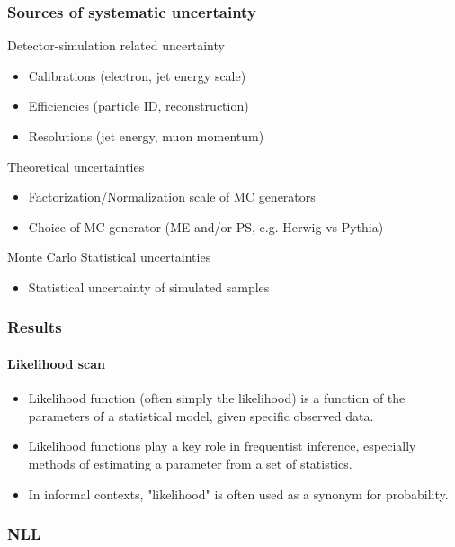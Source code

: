 \documentclass[11pt]{beamer}
\begin{document}
\begin{frame}
\frametitle{Sources of systematic uncertainty}
Detector-simulation related uncertainty
\begin{itemize}
\item Calibrations (electron, jet energy scale)
\item Efficiencies (particle ID, reconstruction)
\item Resolutions (jet energy, muon momentum)
\end{itemize}
Theoretical uncertainties
\begin{itemize}
\item  Factorization/Normalization scale of MC generators
\item Choice of MC generator (ME and/or PS, e.g. Herwig vs Pythia)
\end{itemize}
Monte Carlo Statistical uncertainties
\begin{itemize}\item Statistical uncertainty of simulated samples\cite{2} \end{itemize}
\end{frame}


\begin{frame}
\frametitle{Results}
\framesubtitle{Likelihood scan}
\begin{itemize}
	\item Likelihood function (often simply the likelihood) is a function of the
	parameters of a statistical model, given specific observed data.
	\item Likelihood functions play a key role in frequentist inference,
	especially methods of estimating a parameter from a set of
	statistics.
	\item In informal contexts, "likelihood" is often used as a synonym for
	probability.
\end{itemize}
\end{frame}

\begin{frame}
\frametitle{NLL}


\end{frame}
\end{document}
